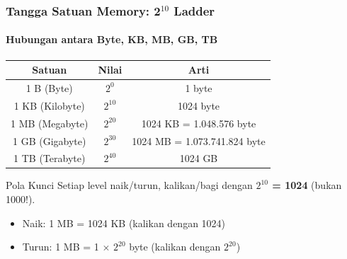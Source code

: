 \documentclass[t,aspectratio=169,xcolor=dvipsnames]{beamer}
\begin{document}
\begin{frame}
    \frametitle{Tangga Satuan Memory: 2$^{10}$ Ladder}
    \framesubtitle{Hubungan antara Byte, KB, MB, GB, TB}
    \small

    \begin{center}
        \begin{tabular}{|c|c|c|}
            \hline
            \textbf{Satuan} & \textbf{Nilai} & \textbf{Arti} \\
            \hline
            1 B (Byte) & $2^0$ & 1 byte \\
            \hline
            1 KB (Kilobyte) & $2^{10}$ & 1024 byte \\
            \hline
            1 MB (Megabyte) & $2^{20}$ & 1024 KB = 1.048.576 byte \\
            \hline
            1 GB (Gigabyte) & $2^{30}$ & 1024 MB = 1.073.741.824 byte \\
            \hline
            1 TB (Terabyte) & $2^{40}$ & 1024 GB \\
            \hline
        \end{tabular}
    \end{center}

    \vspace{0.3cm}
    \begin{alertblock}{Pola Kunci}
        Setiap level naik/turun, kalikan/bagi dengan \textbf{$2^{10}$ = 1024} (bukan 1000!).
        \begin{itemize}
            \item Naik: 1 MB = 1024 KB (kalikan dengan 1024)
            \item Turun: 1 MB = 1 $\times$ $2^{20}$ byte (kalikan dengan $2^{20}$)
        \end{itemize}
    \end{alertblock}
\end{frame}
\end{document}
